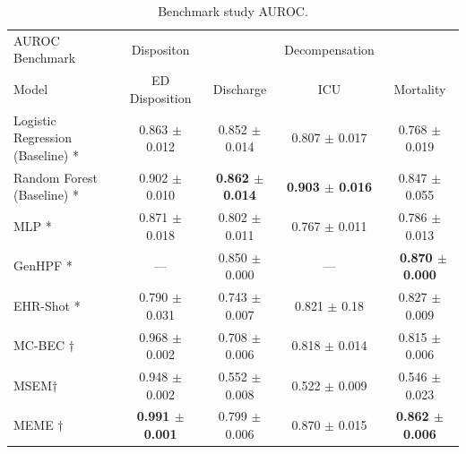 \documentclass{article}
\theoremstyle{plain}
\theoremstyle{definition}
\theoremstyle{remark}
\begin{document}
\begin{table}[H]
\caption{Benchmark study AUROC.}
\label{r2}
\begin{adjustbox}{width=\columnwidth}
\begin{small}
\begin{tabular}{l|c|ccc}
\toprule
AUROC Benchmark & Dispositon & & Decompensation &\\
Model & ED Disposition & Discharge & ICU & Mortality \\
\midrule
Logistic Regression (Baseline) * &0.863 $\pm$ 0.012&0.852 $\pm$ 0.014 & 0.807 $\pm$ 0.017 & 0.768 $\pm$ 0.019\\
Random Forest (Baseline) *& 0.902 $\pm$ 0.010 & \textbf{0.862 $\pm$ 0.014} & \textbf{0.903 $\pm$ 0.016} &   0.847 $\pm$ 0.055\\
MLP *& 0.871 $\pm$ 0.018 & 0.802 $\pm$ 0.011 & 0.767 $\pm$ 0.011 & 0.786 $\pm$ 0.013 \\
GenHPF * & --- & 0.850 $\pm$ 0.000 & ---& \textbf{~0.870 $\pm$ 0.000} \\
EHR-Shot *& 0.790 $\pm$ 0.031 & 0.743 $\pm$ 0.007 & 0.821 $\pm$ 0.18 & 0.827 $\pm$ 0.009\\
MC-BEC $\dagger$& 0.968 $\pm$ 0.002 & 0.708 $\pm$ 0.006 & 0.818 $\pm$ 0.014 & 0.815 $\pm$ 0.006 \\
MSEM$\dagger$& 0.948 $\pm$ 0.002 & 0.552 $\pm$ 0.008 & 0.522 $\pm$ 0.009 & 0.546 $\pm$ 0.023\\
MEME $\dagger$& \textbf{0.991 $\pm$ 0.001} & 0.799 $\pm$ 0.006 & 0.870 $\pm$ 0.015 & \textbf{0.862 $\pm$ 0.006} \\
\bottomrule
\end{tabular}
\end{small}
\end{adjustbox}
\end{table}
\vspace{-0.6cm}
\end{document}
